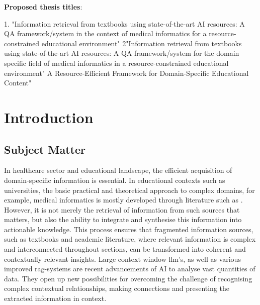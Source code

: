 \textbf{Proposed thesis titles}:

1. "Information retrieval from textbooks using state-of-the-art AI resources: 
A QA framework/system in the context of medical informatics for a resource-constrained educational environment"
2"Information retrieval from textbooks using state-of-the-art AI resources: 
A QA framework/system for the domain specific field of medical informatics in a resource-constrained educational environment"
%
A Resource-Efficient Framework for Domain-Specific Educational Content"
\chapter{Introduction}\label{ch:introduction}
\section{Subject Matter}\label{sec:subject matter}
In healthcare sector and educational landscape, the efficient acquisition of domain-specific information is essential. 
In educational contexts such as universities, the basic practical and theoretical approach to complex domains, for example, medical informatics is mostly developed through literature such as \citet{bb2}.
However, it is not merely the retrieval of information from such sources that matters, but also the ability to integrate and synthesise this information into actionable knowledge.
This process ensures that fragmented information sources, such as textbooks and academic literature, where relevant information is complex and interconnected throughout sections, can be transformed into coherent and contextually relevant insights.
%
Large context window \ac{llm}'s, as well as various improved \ac{rag}-systems are recent advancements of AI to analyse vast quantities of data.
They open up new possibilities for overcoming the challenge of recognising complex contextual relationships, making connections and presenting the extracted information in context.
%
